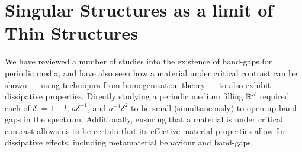 \section{Singular Structures as a limit of Thin Structures} \label{sec:ConvToSS}


We have reviewed a number of studies into the existence of band-gaps for periodic media, and have also seen how a material under critical contrast can be shown --- using techniques from homogenisation theory --- to also exhibit dissipative properties.
Directly studying a periodic medium filling $\mathbb{R}^d$ required each of $\delta:=1-l$, $a\delta^{-1}$, and $a^{-1}\delta^2$ to be small (simultaneously) to open up band gaps in the spectrum.
Additionally, ensuring that a material is under critical contrast allows us to be certain that its effective material properties allow for dissipative effects, including metamaterial behaviour and band-gaps.

